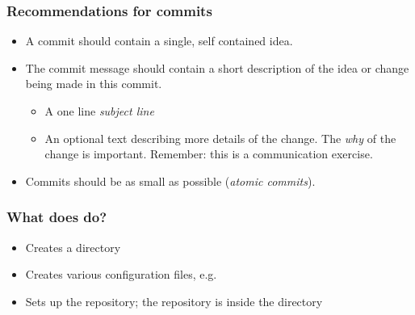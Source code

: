 \begin{frame}
    \frametitle{Recommendations for commits}
    \begin{itemize}
	\item A commit should contain a single, self contained idea.
	\item The commit message should contain a short description of the
	    idea or change being made in this commit.
	    \begin{itemize}
		\item A one line \emph{subject line}
		\item An optional text describing more details of the
		    change.  The \emph{why} of the change is important.
		    Remember: this is a communication exercise.
	    \end{itemize}
	\item Commits should be as small as possible (\emph{atomic
	    commits}).
    \end{itemize}
\end{frame}

\begin{frame}[fragile]
    \frametitle{What does  do?}
    \begin{itemize}
	\item Creates a  directory
	\item Creates various configuration files, e.g.
	\item Sets up the repository; the repository is inside the
	     directory
    \end{itemize}
\end{frame}

